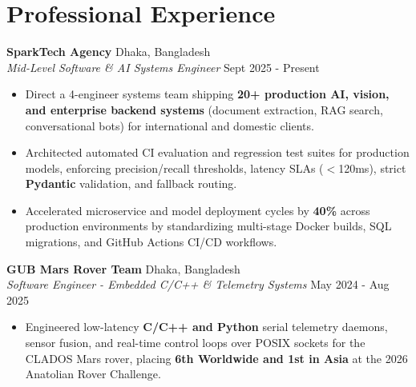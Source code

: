 \documentclass[9.5pt,a4paper]{article}
\begin{document}
\section*{Professional Experience}
\noindent
\textbf{SparkTech Agency} \hfill Dhaka, Bangladesh\\
\textit{Mid-Level Software \& AI Systems Engineer} \hfill Sept 2025 - Present
\begin{itemize}
    \item Direct a 4-engineer systems team shipping \textbf{20+ production AI, vision, and enterprise backend systems} (document extraction, RAG search, conversational bots) for international and domestic clients.
    \item Architected automated CI evaluation and regression test suites for production models, enforcing precision/recall thresholds, latency SLAs ($<$120ms), strict \textbf{Pydantic} validation, and fallback routing.
    \item Accelerated microservice and model deployment cycles by \textbf{40\%} across production environments by standardizing multi-stage Docker builds, SQL migrations, and GitHub Actions CI/CD workflows.
\end{itemize}
\vspace{0.6pt}
\noindent
\textbf{GUB Mars Rover Team} \hfill Dhaka, Bangladesh\\
\textit{Software Engineer - Embedded C/C++ \& Telemetry Systems} \hfill May 2024 - Aug 2025
\begin{itemize}
    \item Engineered low-latency \textbf{C/C++ and Python} serial telemetry daemons, sensor fusion, and real-time control loops over POSIX sockets for the CLADOS Mars rover, placing \textbf{6th Worldwide and 1st in Asia} at the 2026 Anatolian Rover Challenge.
\end{itemize}
\vspace{0.6pt}
\end{document}
